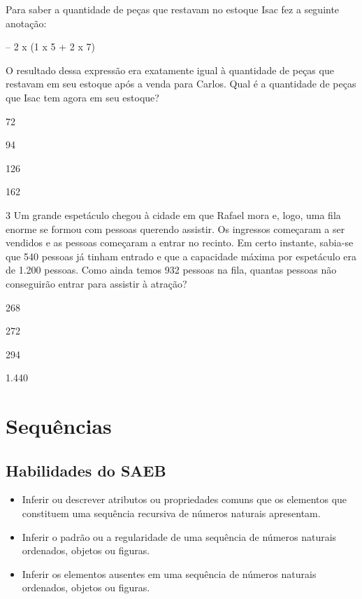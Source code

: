Para saber a quantidade de peças que restavam no estoque Isac fez a
seguinte anotação:

\begin{mdframed}[linewidth=2pt,linecolor=salmao,backgroundcolor=salmao!20]
 – 2 x (1 x 5 + 2 x 7)
\end{mdframed}

O resultado dessa expressão era exatamente igual à quantidade de peças
que restavam em seu estoque após a venda para Carlos. Qual é a
quantidade de peças que Isac tem agora em seu estoque?

\begin{escolha}
\item
  72
\item
  94
\item
  126
\item
  162
\end{escolha}



\num{3} Um grande espetáculo chegou à cidade em que Rafael mora e, logo, uma fila
enorme se formou com pessoas querendo assistir. Os
ingressos começaram a ser vendidos e as pessoas começaram a entrar no
recinto. Em certo instante, sabia-se que 540 pessoas já tinham
entrado e que a capacidade máxima por espetáculo era de 1.200 pessoas. Como ainda temos 932 pessoas na fila, quantas pessoas não
conseguirão entrar para assistir à atração?

\begin{escolha}
\item
  268
\item
  272
\item
  294
\item
  1.440
\end{escolha}



\chapter{Sequências}

\section*{Habilidades do SAEB}

\begin{itemize}
\item Inferir ou descrever atributos ou propriedades comuns que os elementos
que constituem uma sequência recursiva de números naturais apresentam.

\item Inferir o padrão ou a regularidade de uma sequência de números
naturais ordenados, objetos ou figuras.

\item Inferir os elementos ausentes em uma sequência de números naturais
ordenados, objetos ou figuras.
\end{itemize}

